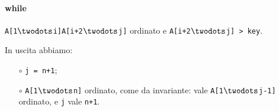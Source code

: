 \paragraph{while} \texttt{A[1$\twodots$i]A[i+2$\twodots$j]} ordinato e 
\texttt{A[i+2$\twodots$j] > key}. \par
\vspace{0.5cm}
In uscita abbiamo: 
\begin{itemize}[noitemsep]
	\item[$\circ$] \texttt{j = n+1}; \par
	\item[$\circ$] \texttt{A[1$\twodots$n]} ordinato, come da invariante: 
	vale \texttt{A[1$\twodots$j-1]}	ordinato, e \texttt{j} vale \texttt{n+1}.
\end{itemize}
